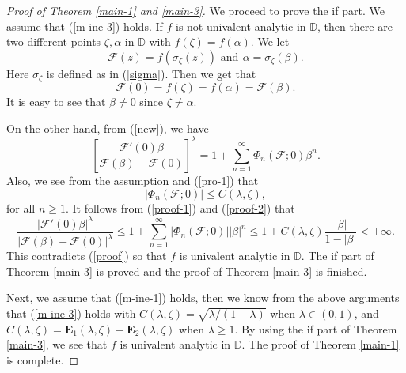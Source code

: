 \documentclass[10pt,a4paper]{amsart}
\begin{document}
\begin{proof}[Proof of Theorem \ref{main-1} and \ref{main-3}]
We proceed to prove the  if part.  We assume that (\ref{m-ine-3}) holds. If $f$ is not univalent analytic in $\mathbb{D}$, then there are two different points $\zeta, \alpha$ in $\mathbb{D}$ with $f(\zeta)=f(\alpha)$. We let
$$\mathcal{F}(z)=f(\sigma_{\zeta}(z))\,\, {\text{and}}\,\ \alpha=\sigma_{\zeta}(\beta).$$
Here $\sigma_{\zeta}$ is defined as in (\ref{sigma}). Then we get that 
\begin{equation}\label{proof}\mathcal{F}(0)=f(\zeta)=f(\alpha)=\mathcal{F}(\beta). \end{equation}
It is easy to see that $\beta \neq 0$ since $\zeta \neq \alpha$.

On the other hand, from (\ref{new}), we have 
\begin{equation}\label{proof-1}
\left[\frac{{\mathcal{F}}'(0)\beta}{\mathcal{F}(\beta)-\mathcal{F}(0)}\right]^{\lambda}=1+\sum_{n=1}^{\infty}\Phi_n(\mathcal{F}; 0){\beta}^n.
\end{equation}
Also, we see from the assumption and (\ref{pro-1}) that
\begin{equation}\label{proof-2}
|\Phi_{n}(\mathcal{F}; 0)|\leq C(\lambda, \zeta),
\end{equation} 
for all $n\geq 1.$
It follows from (\ref{proof-1}) and (\ref{proof-2}) that  
\begin{equation}
\frac{|{\mathcal{F}}'(0)\beta|^{\lambda}}{|\mathcal{F}(\beta)-\mathcal{F}(0)|^{\lambda}}\leq 1+\sum_{n=1}^{\infty}|\Phi_n(\mathcal{F}; 0)|{|\beta|}^n\leq 1+C(\lambda, \zeta)\frac{|\beta|}{1-|\beta|} <+\infty. \nonumber
\end{equation}
This contradicts (\ref{proof}) so that $f$ is univalent analytic in $\mathbb{D}$.  The if part of Theorem \ref{main-3} is proved and the proof of Theorem \ref{main-3} is finished.

Next, we assume that (\ref{m-ine-1}) holds, then we know from the above arguments that  (\ref{m-ine-3}) holds with $C(\lambda, \zeta)=\sqrt{\lambda/(1-\lambda)}$ when $\lambda\in (0,1)$, 
and  $C(\lambda, \zeta)=\mathbf{E}_1(\lambda, \zeta)+\mathbf{E}_2(\lambda, \zeta)$ when $\lambda\geq 1.$  By using the if part of Theorem \ref{main-3},  we see that $f$ is univalent analytic in $\mathbb{D}$. The proof of Theorem \ref{main-1} is complete. 
\end{proof}
\end{document}
